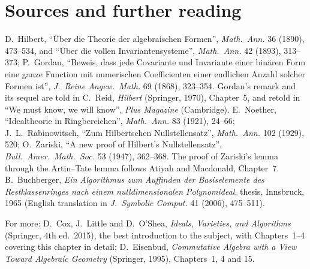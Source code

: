 \section*{Sources and further reading}

D.~Hilbert, ``Über die Theorie der algebraischen Formen'', \emph{Math.\ Ann.} 36 (1890), 473--534, and ``Über die vollen Invariantensysteme'', \emph{Math.\ Ann.} 42 (1893), 313--373; P.~Gordan, ``Beweis, dass jede Covariante und
Invariante einer binären Form eine ganze Function mit numerischen Coefficienten einer endlichen Anzahl solcher Formen ist'', \emph{J.\ Reine Angew.\ Math.} 69 (1868), 323--354. Gordan's remark and its sequel are told in
C.~Reid, \emph{Hilbert} (Springer, 1970), Chapter~5, and retold in ``We must know, we will know'', \emph{Plus Magazine} (Cambridge). E.~Noether, ``Idealtheorie in Ringbereichen'', \emph{Math.\ Ann.} 83 (1921), 24--66;
J.~L.~Rabinowitsch, ``Zum Hilbertschen Nullstellensatz'', \emph{Math.\ Ann.} 102 (1929), 520; O.~Zariski, ``A new proof of Hilbert's Nullstellensatz'', \emph{Bull.\ Amer.\ Math.\ Soc.} 53 (1947), 362--368. The proof of
Zariski's lemma through the Artin--Tate lemma follows Atiyah and Macdonald, Chapter~7. B.~Buchberger, \emph{Ein Algorithmus zum Auffinden der Basiselemente des Restklassenringes nach einem nulldimensionalen Polynomideal},
thesis, Innsbruck, 1965 (English translation in \emph{J.\ Symbolic Comput.} 41 (2006), 475--511).

For more: D.~Cox, J.~Little and D.~O'Shea, \emph{Ideals, Varieties, and Algorithms} (Springer, 4th ed.\ 2015), the best introduction to the subject, with Chapters~1--4 covering this chapter in detail; D.~Eisenbud,
\emph{Commutative Algebra with a View Toward Algebraic Geometry} (Springer, 1995), Chapters~1, 4 and 15.
